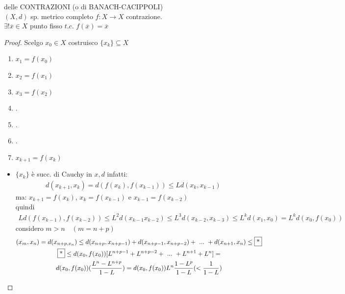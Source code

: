 \documentclass[a4paper, oneside]{article}
\begin{document}
    \begin{theorem}
        delle CONTRAZIONI (o di BANACH-CACIPPOLI)\\
        $(X,d)$ sp. metrico completo $f:X \to X$ contrazione.\\
         $\exists! \overline{x} \in X $ punto fisso $t.c.$ $f(\overline{x}) = \overline{x}$\\
    \end{theorem}

    \begin{proof}
        Scelgo $x_0 \in X$ costruisco $\{x_k\} \subseteq X$\\
        \begin{enumerate}[ ]
            \item $x_1 = f(x_0)$
            \item $x_2 = f(x_1)$
            \item $x_3 = f(x_2)$
            \item .
            \item .
            \item .
            \item $x_{k+1} = f(x_k)$
        \end{enumerate}
        \begin{itemize}
            \item $\{x_k\}$ è succ. di Cauchy in $x,d$ infatti:\\
            \begin{gather*}
                d(x_{k+1}, x_k) = d(f(x_k), f(x_{k-1})) \leq  L d(x_k, x_{k-1})
            \end{gather*}
            ma: $x_{k+1} = f(x_k)$, $x_k = f(x_{k-1})$ e $x_{k-1} = f(x_{k-2})$\\
            quindi
            \begin{gather*}
                L d(f(x_{k-1}), f(x_{k-2})) \leq L^2 d(x_{k-1} x_{k-2}) \leq L^3 d(x_{k-2}, x_{k-3}) \leq L^k d(x_1, x_0) = L^k d(x_0, f(x_0))
            \end{gather*}
            considero $m>n \quad (m=n+p)$
            \begin{gather*}
                (x_m, x_n) = d(x_{n+p, x_n}) \leq d(x_{n+p}, x_{n+p-1}) +d(x_{n+p-1}, x_{n+p-2}) + \ ... \ + d(x_{n+1}, x_n)  \leq \text{\fbox{*}}\\
                \text{\fbox{*}} \leq d(x_0, f(x_0)) [L^{n+p-1}+L^{n+p-2}+ \ ... \ + L^{n+1} + L^n] = \\
                d(x_0, f(x_0)) (\frac{L^n-L^{n+p}}{1-L}) = d(x_0, f(x_0)) L^n \frac{1-L^p}{1-L} (< \frac{1}{1-L})\\

\end{gather*}
\end{itemize}
\end{proof}
\end{document}
